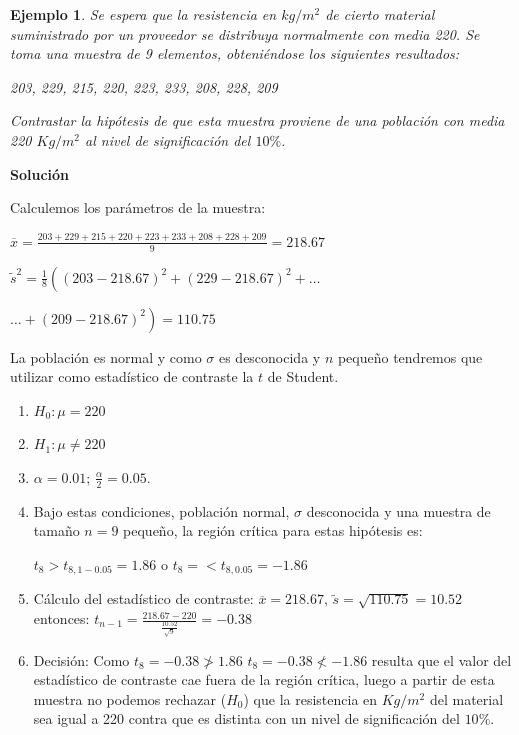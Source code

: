 \documentclass[12pt]{report}
\newtheorem{example}[definition]{Ejemplo}
\begin{document}
    \begin{example}
    Se espera que la resistencia en $kg/m^2$  de
    cierto material suministrado por un proveedor se distribuya
    normalmente con media 220. %
    Se toma una
    muestra de 9 elementos, obteniéndose los siguientes resultados:

    203, 229, 215, 220, 223, 233, 208, 228, 209

    Contrastar la hipótesis de que esta muestra proviene de una
        población con media 220 $Kg/m^2$ al nivel de significación del
        $10\%$.
        \end{example}
%
        \textbf{Solución}

        Calculemos los parámetros de la muestra:

        $\overline{x}=\frac{203+ 229+ 215+ 220+ 223+ 233+ 208+ 228+
        209}{9}=218.67$

        $\tilde{s}^2= \frac{1}{8}\left((203-218.67)^2+(229-218.67)^2+\ldots\right.$
 
        $\left. \ldots+
         (209-218.67)^2\right)=110.75$


 La población es normal y como $\sigma$ es desconocida y $n$ pequeño
 tendremos que utilizar como estadístico de contraste la $t$ de
 Student.
\begin{enumerate}[1)]
 \item $H_{0}:\mu=220$
 \item $H_{1}:\mu\not=220$
 \item $\alpha=0.01$; $\frac{\alpha}{2}=0.05$.  
\item Bajo estas condiciones, población normal, $\sigma$ desconocida
 y una muestra de tamaño  $n=9$ pequeño, la región crítica para estas
 hipótesis es:


    $t_{8}>t_{8,1-0.05}=1.86$ o $t_{8}=<t_{8,0.05}=-1.86$

\item Cálculo del estadístico de contraste:
 $\overline{x}=218.67$, $\tilde{s}=\sqrt{110.75}=10.52$  entonces:
 $t_{n-1}=\frac{218.67-220}{\frac{10.52}{\sqrt{9}}}=-0.38$
  \item Decisión: Como $t_{8}=-0.38\not>1.86$  $t_{8}=-0.38\not<-1.86$
  resulta que el valor del estadístico
 de contraste cae fuera de la región crítica, luego  a partir de esta
 muestra no podemos
 rechazar ($H_{0}$) que la resistencia en $Kg/m^2$  del
 material sea igual a 220 contra que es distinta
con un nivel de significación del $10\%$.
\end{enumerate}
\end{document}
